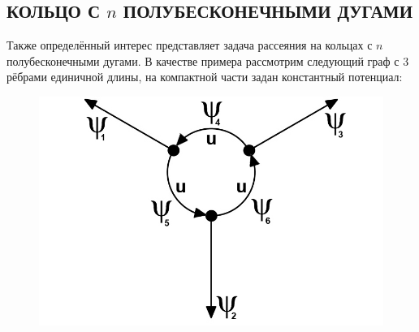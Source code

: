 \documentclass[a4 paper, 12 pt]{extarticle}
\begin{document}
   \subsection{КОЛЬЦО С $n$ ПОЛУБЕСКОНЕЧНЫМИ ДУГАМИ}
   Также определённый интерес представляет задача рассеяния на кольцах с $n$ полубесконечными дугами. В качестве примера рассмотрим следующий граф с 3 рёбрами единичной длины, на компактной части задан константный потенциал:
   \begin{figure}[h]
   	\centering
   	\includegraphics[scale=0.5]{arrow_graph.jpg}
   \end{figure}
   
\end{document}
